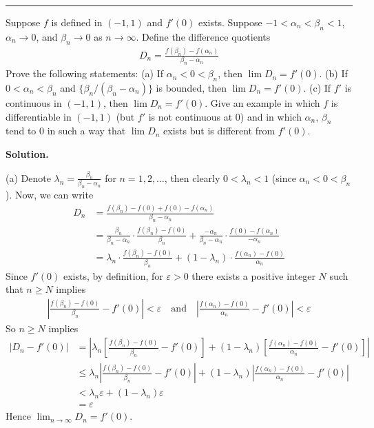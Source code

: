 \documentclass[12pt]{article}
\theoremstyle{definition}
\begin{document}
\bigskip\noindent\hrule\bigskip

Suppose $f$ is defined in $(-1,1)$ and $f'(0)$ exists. Suppose $-1<\alpha_n<\beta_n<1$, $\alpha_n\to 0$, and $\beta_n\to 0$ as $n\to\infty$. Define the difference quotients
\begin{align*}
D_n=\frac{f(\beta_n)-f(\alpha_n)}{\beta_n-\alpha_n}
\end{align*}
Prove the following statements:
(a) If $\alpha_n<0<\beta_n$, then $\lim D_n=f'(0)$.
(b) If $0<\alpha_n<\beta_n$ and $\{\beta_n/(\beta_n-\alpha_n)\}$ is bounded, then $\lim D_n=f'(0)$.
(c) If $f'$ is continuous in $(-1,1)$, then $\lim D_n=f'(0)$.
Give an example in which $f$ is differentiable in $(-1,1)$ (but $f'$ is not continuous at $0$) and in which $\alpha_n$, $\beta_n$ tend to $0$ in such a way that $\lim D_n$ exists but is different from $f'(0)$.

\smallskip
\noindent\textbf{Solution.}\quad

(a) Denote $\lambda_n=\frac{\beta_n}{\beta_n-\alpha_n}$ for $n=1,2,\ldots$, then clearly $0<\lambda_n<1$ (since $\alpha_n<0<\beta_n$). Now, we can write
\begin{align*}
D_n
&=\frac{f(\beta_n)-f(0)+f(0)-f(\alpha_n)}{\beta_n-\alpha_n} \\
&=\frac{\beta_n}{\beta_n-\alpha_n}\cdot\frac{f(\beta_n)-f(0)}{\beta_n}
+\frac{-\alpha_n}{\beta_n-\alpha_n}\cdot\frac{f(0)-f(\alpha_n)}{-\alpha_n} \\
&=\lambda_n\cdot\frac{f(\beta_n)-f(0)}{\beta_n}
+\left(1-\lambda_n\right)\cdot\frac{f(\alpha_n)-f(0)}{\alpha_n}
\end{align*}
Since $f'(0)$ exists, by definition, for $\varepsilon>0$ there exists a positive integer $N$ such that $n\ge N$ implies
\begin{align*}
\left\vert\frac{f(\beta_n)-f(0)}{\beta_n}-f'(0)\right\vert<\varepsilon\quad\mbox{and}\quad
\left\vert\frac{f(\alpha_n)-f(0)}{\alpha_n}-f'(0)\right\vert<\varepsilon
\end{align*}
So $n\ge N$ implies
\begin{align*}
\left\vert D_n-f'(0)\right\vert
&=\left\vert \lambda_n\left[\frac{f(\beta_n)-f(0)}{\beta_n}-f'(0)\right]
+(1-\lambda_n)\left[\frac{f(\alpha_n)-f(0)}{\alpha_n}-f'(0)\right]\right\vert \\
&\le\lambda_n\left\vert\frac{f(\beta_n)-f(0)}{\beta_n}-f'(0)\right\vert
+(1-\lambda_n)\left\vert\frac{f(\alpha_n)-f(0)}{\alpha_n}-f'(0)\right\vert \\
&<\lambda_n\varepsilon+\left(1-\lambda_n\right)\varepsilon \\
&=\varepsilon
\end{align*}
Hence $\lim_{n\to\infty}D_n=f'(0)$.
\end{document}
